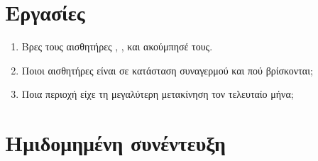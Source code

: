 \section{Εργασίες}
\begin{enumerate}
  \item Βρες τους αισθητήρες , ,  και ακούμπησέ τους.
  \item Ποιοι αισθητήρες είναι σε κατάσταση συναγερμού και πού βρίσκονται;
  \item Ποια περιοχή είχε τη μεγαλύτερη μετακίνηση τον τελευταίο μήνα;
\end{enumerate}

\section{Ημιδομημένη συνέντευξη}

